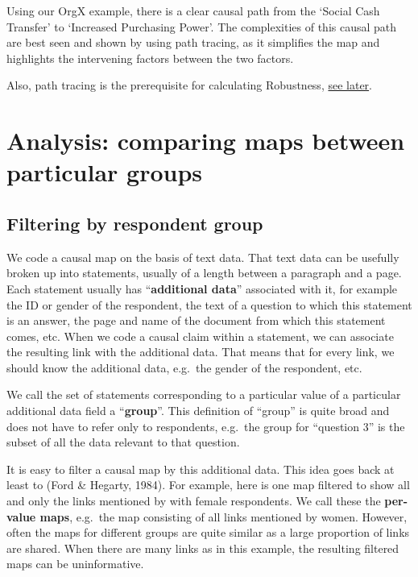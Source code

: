 \documentclass[
]{book}
\begin{document}
Using our OrgX example, there is a clear causal path from the `Social Cash Transfer' to `Increased Purchasing Power'. The complexities of this causal path are best seen and shown by using path tracing, as it simplifies the map and highlights the intervening factors between the two factors.

Also, path tracing is the prerequisite for calculating Robustness, \protect\hyperlink{quantifying-causal-evidence}{see later}.

\hypertarget{comparing}{%
\chapter{Analysis: comparing maps between particular groups}\label{comparing}}

\hypertarget{filtering-by-respondent-group}{%
\section{Filtering by respondent group}\label{filtering-by-respondent-group}}

We code a causal map on the basis of text data. That text data can be usefully broken up into statements, usually of a length between a paragraph and a page. Each statement usually has ``\textbf{additional data}'' associated with it, for example the ID or gender of the respondent, the text of a question to which this statement is an answer, the page and name of the document from which this statement comes, etc. When we code a causal claim within a statement, we can associate the resulting link with the additional data. That means that for every link, we should know the additional data, e.g.~the gender of the respondent, etc.

We call the set of statements corresponding to a particular value of a particular additional data field a ``\textbf{group}''. This definition of ``group'' is quite broad and does not have to refer only to respondents, e.g.~the group for ``question 3'' is the subset of all the data relevant to that question.

It is easy to filter a causal map by this additional data. This idea goes back at least to (Ford \& Hegarty, 1984). For example, here is one map filtered to show all and only the links mentioned by with female respondents. We call these the \textbf{per-value maps}, e.g.~the map consisting of all links mentioned by women. However, often the maps for different groups are quite similar as a large proportion of links are shared. When there are many links as in this example, the resulting filtered maps can be uninformative.
\end{document}
